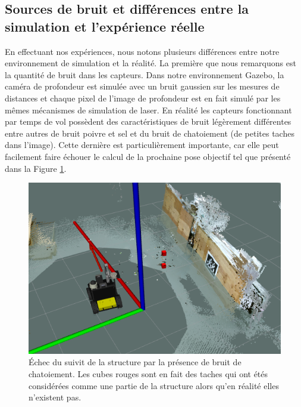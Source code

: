 \subsection{Sources de bruit et différences entre la simulation et l'expérience réelle}
\label{subsec:ugv_noise_sim}

En effectuant nos expériences, nous notons plusieurs différences entre notre environnement de simulation et la réalité. La première que nous remarquons est la quantité de bruit dans les capteurs. Dans notre environnement Gazebo, la caméra de profondeur est simulée avec un bruit gaussien sur les mesures de distances et chaque pixel de l'image de profondeur est en fait simulé par les mêmes mécanismes de simulation de laser. En réalité les capteurs fonctionnant par temps de vol possèdent des caractéristiques de bruit légèrement différentes entre autres de bruit poivre et sel et du bruit de chatoiement (de petites taches dans l'image). Cette dernière est particulièrement importante, car elle peut facilement faire échouer le calcul de la prochaine pose objectif tel que présenté dans la Figure \ref{fig:speckle_fail}.

\begin{figure}[!th]
  \centering
  \includegraphics[width=0.7\linewidth]{images/speckle.png}
  \caption{Échec du suivit de la structure par la présence de bruit de chatoiement. Les cubes rouges sont en fait des taches qui ont étés considérées comme une partie de la structure alors qu'en réalité elles n'existent pas.}
  \label{fig:speckle_fail}
\end{figure}

